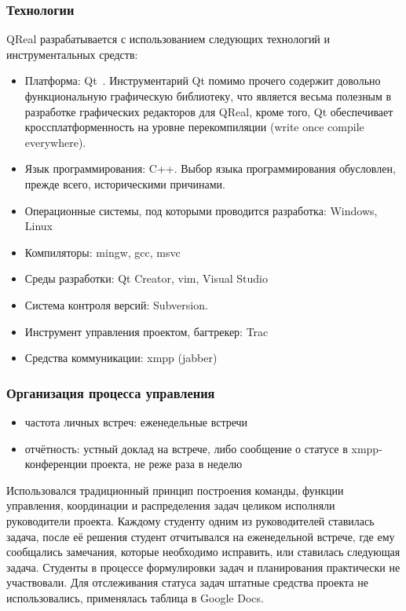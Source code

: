 \documentclass[a5paper]{article}
\begin{document}
\subsubsection{Технологии}
QReal разрабатывается с использованием следующих технологий и инструментальных средств:
\begin{itemize}
	\item Платформа: Qt~\cite{qt}. Инструментарий Qt помимо прочего содержит довольно функциональную графическую библиотеку, что является весьма полезным в разработке графических редакторов для QReal, кроме того, Qt обеспечивает кроссплатформенность на уровне перекомпиляции (write once compile everywhere).
	\item Язык программирования: C++. Выбор языка программирования обусловлен, прежде всего, историческими причинами.
	\item Операционные системы, под которыми проводится разработка: Windows, Linux
	\item Компиляторы: mingw, gcc, msvc
	\item Среды разработки: Qt Creator, vim, Visual Studio
	\item Система контроля версий: Subversion.
	\item Инструмент управления проектом, багтрекер: Trac
	\item Средства коммуникации: xmpp (jabber)
\end{itemize}

\subsubsection{Организация процесса управления}
\begin{itemize}
	\item частота личных встреч: еженедельные встречи
	\item отчётность: устный доклад на встрече, либо сообщение о статусе в xmpp-конференции проекта, не реже раза в неделю
\end{itemize}

Использовался традиционный принцип построения команды, функции управления, координации и распределения задач целиком исполняли руководители проекта. Каждому студенту одним из руководителей ставилась задача, после её решения студент отчитывался на еженедельной встрече, где ему сообщались замечания, которые необходимо исправить, или ставилась следующая задача. Студенты в процессе формулировки задач и планирования практически не участвовали. Для отслеживания статуса задач штатные средства проекта не использовались, применялась таблица в Google Docs.
\end{document}
